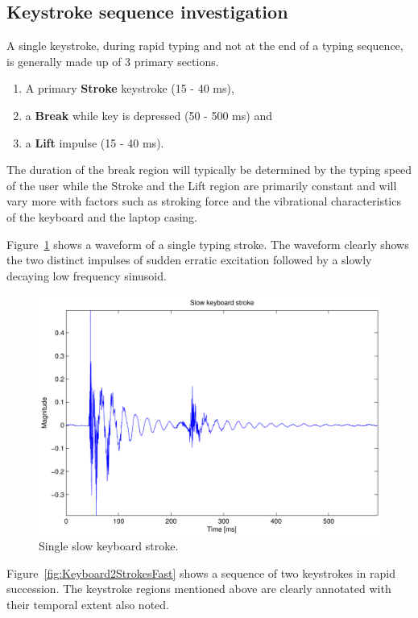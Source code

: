 \subsection{Keystroke sequence investigation}
A single keystroke, during rapid typing and not at the end of a typing sequence, is generally made up of 3 primary sections.
\begin{enumerate}
  \item A primary \textbf{Stroke} keystroke (15 - 40 ms),
  \item a \textbf{Break} while key is depressed (50 - 500 ms) and
  \item a \textbf{Lift} impulse (15 - 40 ms).
\end{enumerate}
The duration of the break region will typically be determined by the typing speed of the user while the Stroke and the Lift region are primarily constant and will vary more with factors such as stroking force and the vibrational characteristics of the keyboard and the laptop casing.

Figure~\ref{fig:KeyboardStrokeSlow} shows a waveform of a single typing stroke. The waveform clearly shows the two distinct impulses of sudden erratic excitation followed by a slowly decaying low frequency sinusoid.

\begin{figure}[!] %
\centering
\includegraphics[width=120mm]{KeyboardStrokeSlow.pdf}
\caption{Single slow keyboard stroke.}\label{fig:KeyboardStrokeSlow}
\end{figure}

Figure~\ref{fig:Keyboard2StrokesFast} shows a sequence of two keystrokes in rapid succession. The keystroke regions mentioned above are clearly annotated with their temporal extent also noted.

